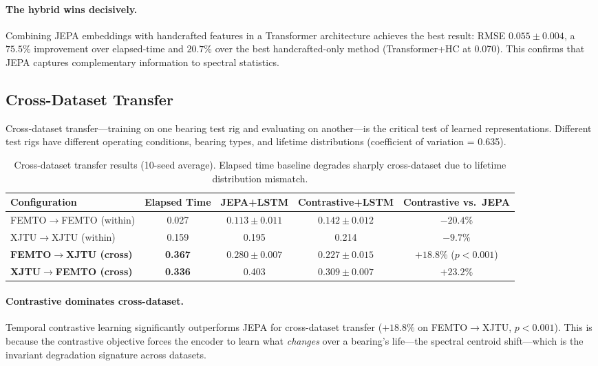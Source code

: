 \paragraph{The hybrid wins decisively.} Combining JEPA embeddings with handcrafted features in a Transformer architecture achieves the best result: RMSE $0.055 \pm 0.004$, a $75.5\%$ improvement over elapsed-time and $20.7\%$ over the best handcrafted-only method (Transformer+HC at 0.070). This confirms that JEPA captures complementary information to spectral statistics.

\subsection{Cross-Dataset Transfer}
\label{sec:transfer}

Cross-dataset transfer---training on one bearing test rig and evaluating on another---is the critical test of learned representations. Different test rigs have different operating conditions, bearing types, and lifetime distributions (coefficient of variation = 0.635).

\begin{table}[t]
\centering
\caption{Cross-dataset transfer results (10-seed average). Elapsed time baseline degrades sharply cross-dataset due to lifetime distribution mismatch.}
\label{tab:transfer}
\small
\begin{tabular}{@{}lcccc@{}}
\toprule
Configuration & Elapsed Time & JEPA+LSTM & Contrastive+LSTM & Contrastive vs.\ JEPA \\
\midrule
FEMTO$\to$FEMTO (within) & 0.027 & $0.113 \pm 0.011$ & $0.142 \pm 0.012$ & $-20.4\%$ \\
XJTU$\to$XJTU (within) & 0.159 & 0.195 & 0.214 & $-9.7\%$ \\
\midrule
\textbf{FEMTO$\to$XJTU (cross)} & \textbf{0.367} & $0.280 \pm 0.007$ & $\mathbf{0.227 \pm 0.015}$ & $+18.8\%$ ($p < 0.001$) \\
\textbf{XJTU$\to$FEMTO (cross)} & \textbf{0.336} & 0.403 & $\mathbf{0.309 \pm 0.007}$ & $+23.2\%$ \\
\bottomrule
\end{tabular}
\end{table}

\paragraph{Contrastive dominates cross-dataset.} Temporal contrastive learning significantly outperforms JEPA for cross-dataset transfer ($+18.8\%$ on FEMTO$\to$XJTU, $p < 0.001$). This is because the contrastive objective forces the encoder to learn what \emph{changes} over a bearing's life---the spectral centroid shift---which is the invariant degradation signature across datasets.

